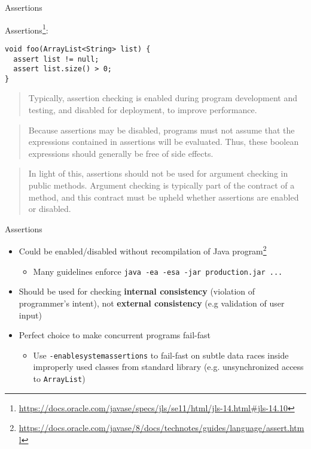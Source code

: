 

\begin{frame}[fragile]{Assertions}

Assertions\footnote{\tiny\url{https://docs.oracle.com/javase/specs/jls/se11/html/jls-14.html#jls-14.10}}:

\begin{verbatim}
void foo(ArrayList<String> list) {
  assert list != null;
  assert list.size() > 0;
}
\end{verbatim}

\pause

\begin{quote}
Typically, assertion checking is enabled during program development and testing, and disabled for deployment, to improve performance.
\end{quote}

\pause

\begin{quote}
Because assertions may be disabled, programs must not assume that the expressions contained in assertions will be evaluated. Thus, these boolean expressions should generally be free of side effects. 
\end{quote}

\pause

\begin{quote}
In light of this, assertions should not be used for argument checking in public methods. Argument checking is typically part of the contract of a method, and this contract must be upheld whether assertions are enabled or disabled.
\end{quote}

\end{frame}


\begin{frame}[fragile]{Assertions}

\begin{itemize}
  \item Could be enabled/disabled without recompilation of Java program\footnote{\tiny\url{https://docs.oracle.com/javase/8/docs/technotes/guides/language/assert.html}}
  \begin{itemize}
    \item Many guidelines enforce \texttt{java -ea -esa -jar production.jar ...}
  \end{itemize}

  \item Should be used for checking \textbf{internal consistency} (violation of programmer's intent), not \textbf{external consistency} (e.g validation of user input)

  \item Perfect choice to make concurrent programs fail-fast
  \begin{itemize}
    \item Use \texttt{-enablesystemassertions} to fail-fast on subtle data races inside improperly used classes from standard library (e.g. unsynchronized access to \texttt{ArrayList})
  \end{itemize}
\end{itemize}
\end{frame}


